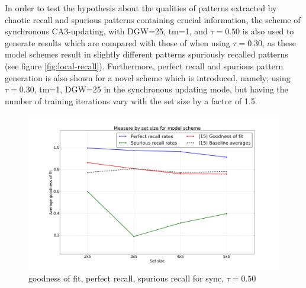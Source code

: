 
In order to test the hypothesis about the qualities of patterns extracted by chaotic recall and spurious patterns containing crucial information, the scheme of synchronous CA3-updating, with DGW=25, tm=1, and $\tau=0.50$ is also used to generate results which are compared with those of when using $\tau=0.30$, as these model schemes result in slightly different patterns spuriously recalled patterns (see figure \ref{fig:local-recall}). Furthermore, perfect recall and spurious pattern generation is also shown for a novel scheme which is introduced, namely; using $\tau=0.30$, tm=1, DGW=25 in the synchronous updating mode, but having the number of training iterations vary with the set size by a factor of 1.5.



\begin{figure}
    \centering
    \includegraphics[width=13cm]{fig/hypothesis-test-sync/combined-measures-sync-tr50-tm1-dgw25}
    \caption{goodness of fit, perfect recall, spurious recall for sync, $\tau=0.50$}
    \label{fig:combined-measures-sync-tr50-tm1-dgw25}
\end{figure}

